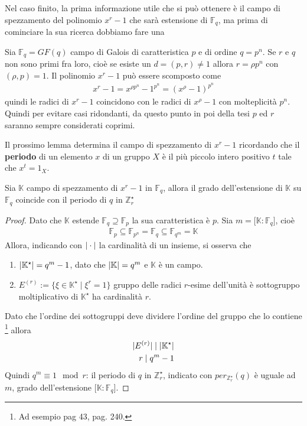 Nel caso finito, la prima informazione utile che si può ottenere è il campo di spezzamento del polinomio $x^r-1$ che sarà estensione di $\mathbb{F}_{q}$, ma prima di cominciare la sua ricerca dobbiamo fare una
\begin{osservazione}\label{cap2:osservaziorp}
Sia $\mathbb{F}_{q} = GF(q)$ campo di Galois di caratteristica $p$ e di ordine $q=p^n$. Se $r$ e $q$ non sono primi fra loro, cioè se esiste un $d = (p,r) \neq 1$ allora $r = \rho p^n$ con $(\rho,p) = 1$. Il polinomio $x^r-1$ può essere scomposto come
\begin{align*}
x^r-1 =  x^{\rho p^n} - 1^{p^{n}} = (x^{\rho}-1)^{p^n} 
\end{align*}
quindi le radici di $x^r-1$ coincidono con le radici di $x^{\rho}-1$ con molteplicità $p^n$.
Quindi per evitare casi ridondanti, da questo punto in poi della tesi $p$ ed $r$ saranno sempre considerati coprimi. 
\end{osservazione}
Il prossimo lemma determina il campo di spezzamento di $x^r-1$ ricordando che il {\bf periodo} di un elemento $x$ di un gruppo $X$ è il più piccolo intero positivo $t$ tale che $x^t = 1_{X}$.
\begin{lemmax} \label{le:campoDiSpezzamento}
Sia $\mathbb{K}$ campo di spezzamento di $x^r-1$ in $\mathbb{F}_{q}$, allora il grado dell'estensione di $\mathbb{K}$ su $\mathbb{F}_{q}$ coincide con il periodo di $q$ in $\mathbb{Z}_{r}^{\star}$
\end{lemmax}
\begin{proof}
Dato che $\mathbb{K}$ estende $\mathbb{F}_{q} \supseteq \mathbb{F}_{p}$ la sua caratteristica è $p$.
Sia $m = \lbrack \mathbb{K} : \mathbb{F}_{q} \rbrack$, cioè
\begin{align*}
   \mathbb{F}_{p} \subseteq \mathbb{F}_{p^n} =  \mathbb{F}_{q}\subseteq \mathbb{F}_{q^m} = \mathbb{K}
\end{align*}
Allora, indicando con $\arrowvert \cdot \arrowvert$ la cardinalità di un insieme, si osserva che 
\begin{enumerate}
   \item $\arrowvert \mathbb{K}^{\star} \arrowvert = q^m -1$, dato che $\arrowvert \mathbb{K} \arrowvert = q^m$ e $\mathbb{K}$ è un campo.
   \item $E^{(r)} := \lbrace \xi \in \mathbb{K}^{\star} \mid \xi^{r} = 1 \rbrace$ gruppo delle radici $r$-esime dell'unità è sottogruppo moltiplicativo di $\mathbb{K}^{\star}$ ha cardinalità $r$. 
\end{enumerate}
Dato che l'ordine dei sottogruppi deve dividere l'ordine del gruppo che lo contiene
\footnote{Ad esempio \cite{herstein} pag 43, \cite{cattaneo} pag. 240.}
allora 
\begin{align*}
   \arrowvert E^{(r)} \arrowvert \mid \arrowvert \mathbb{K}^{\star} \arrowvert \\
   r \mid q^m - 1
\end{align*}
Quindi $q^m \equiv 1 \mod{r}$: il periodo di $q$ in $\mathbb{Z}_{r}^{\star}$, indicato con 
$per_{\mathbb{Z}_{r}^{\star}}(q)$ è uguale ad $m$, grado dell'estensione $\lbrack \mathbb{K} : \mathbb{F}_{q} \rbrack$.
\end{proof}

